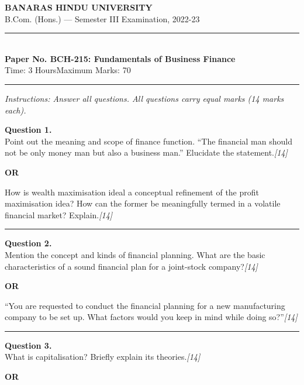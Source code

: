 \documentclass[11pt,a4paper]{article}
\newcommand{\pts}[1]{\hfill   \textit{[#1]}}
\begin{document}
\begin{center}
  {\large\bfseries BANARAS HINDU UNIVERSITY}\\[2pt]
  {\normalsize B.Com. (Hons.) --- Semester III Examination, 2022-23}\\[6pt]
  \rule{0.8\linewidth}{0.5pt}\\[6pt]
  {\large\bfseries Paper No. BCH-215: Fundamentals of Business Finance}\\[4pt]
  {\normalsize Time: 3 Hours\hfill Maximum Marks: 70}
\end{center}

\rule{\linewidth}{0.4pt}

\smallskip



\noindent   \textit{Instructions: Answer all questions. All questions carry equal marks (14 marks each).}

\bigskip




\noindent   \textbf{Question 1.} \\
Point out the meaning and scope of finance function. ``The financial man should not be only money man but also a business man.'' Elucidate the statement.\pts{14}

\centerline{   \textbf{OR}}

How is wealth maximisation ideal a conceptual refinement of the profit maximisation idea? How can the former be meaningfully termed in a volatile financial market? Explain.\pts{14}

\medskip\rule{\linewidth}{0.2pt}




\noindent   \textbf{Question 2.} \\
Mention the concept and kinds of financial planning. What are the basic characteristics of a sound financial plan for a joint-stock company?\pts{14}

\centerline{   \textbf{OR}}

``You are requested to conduct the financial planning for a new manufacturing company to be set up. What factors would you keep in mind while doing so?''\pts{14}

\medskip\rule{\linewidth}{0.2pt}




\noindent   \textbf{Question 3.} \\
What is capitalisation? Briefly explain its theories.\pts{14}

\centerline{   \textbf{OR}}
\end{document}
